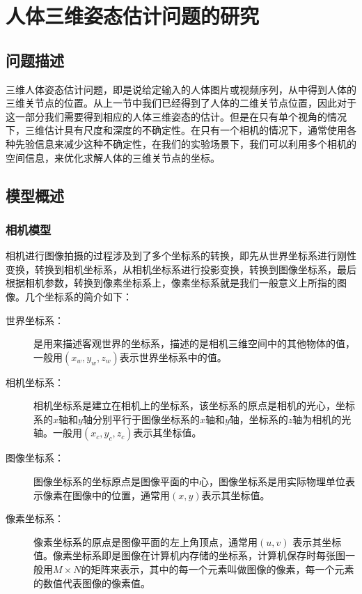 

\newcommand{\qczb}{齐次坐标}
\newpage
\section{人体三维姿态估计问题的研究}
\subsection{问题描述}
三维人体姿态估计问题，即是说给定输入的人体图片或视频序列，从中得到人体的三维关节点的位置。从上一节中我们已经得到了人体的二维关节点位置，因此对于这一部分我们需要得到相应的人体三维姿态的估计。但是在只有单个视角的情况下，三维估计具有尺度和深度的不确定性。在只有一个相机的情况下，通常使用各种先验信息来减少这种不确定性，在我们的实验场景下，我们可以利用多个相机的空间信息，来优化求解人体的三维关节点的坐标。

\subsection{模型概述}
\subsubsection{相机模型}
相机进行图像拍摄的过程涉及到了多个坐标系的转换，即先从世界坐标系进行刚性变换，转换到相机坐标系，从相机坐标系进行投影变换，转换到图像坐标系，最后根据相机参数，转换到像素坐标系上，像素坐标系就是我们一般意义上所指的图像。几个坐标系的简介如下：
\begin{description}
    \item[世界坐标系：] 是用来描述客观世界的坐标系，描述的是相机三维空间中的其他物体的值，一般用\((x_w, y_w, z_w)\)表示世界坐标系中的值。
    \item[相机坐标系：] 相机坐标系是建立在相机上的坐标系，该坐标系的原点是相机的光心，坐标系的\(x\)轴和\(y\)轴分别平行于图像坐标系的\(x\)轴和\(y\)轴，坐标系的\(z\)轴为相机的光轴。一般用\((x_c,y_c,z_c)\)表示其坐标值。
    \item[图像坐标系：] 图像坐标系的坐标原点是图像平面的中心，图像坐标系是用实际物理单位表示像素在图像中的位置，通常用\((x,y)\)表示其坐标值。
    \item[像素坐标系：] 像素坐标系的原点是图像平面的左上角顶点，通常用\((u,v)\) 表示其坐标值。像素坐标系即是图像在计算机内存储的坐标系，计算机保存时每张图一般用\(M\times N\)的矩阵来表示，其中的每一个元素叫做图像的像素，每一个元素的数值代表图像的像素值。
\end{description}

